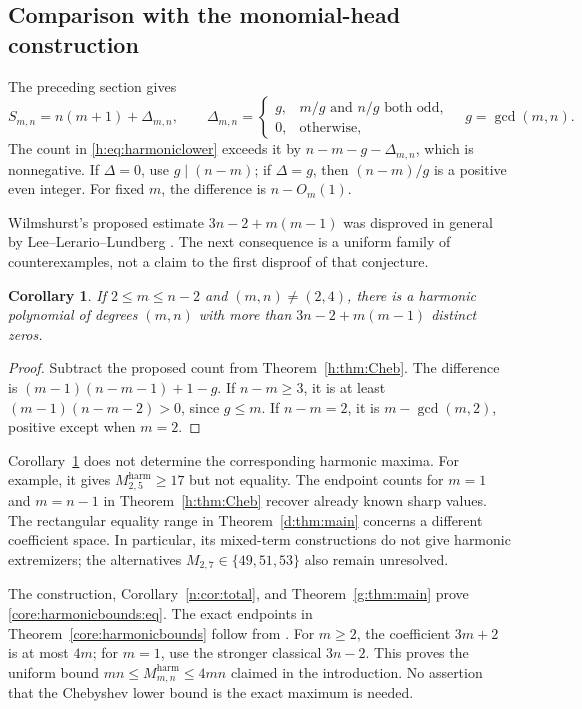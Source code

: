 \documentclass[UTF8,11pt]{ctexart}
\newtheorem{cor}[thm]{Corollary}
\theoremstyle{definition}
\numberwithin{equation}{section}
\begin{document}
\subsection{Comparison with the monomial-head construction}
The preceding section gives
\[
 S_{m,n}=n(m+1)+\Delta_{m,n},\qquad
 \Delta_{m,n}=\begin{cases}
 g,&m/g\text{ and }n/g\text{ both odd},\\
 0,&\text{otherwise},
 \end{cases}\quad g=\gcd(m,n).
\]
The count in \eqref{h:eq:harmoniclower} exceeds it by $n-m-g-\Delta_{m,n}$,
which is nonnegative. If $\Delta=0$, use $g\mid(n-m)$; if $\Delta=g$,
then $(n-m)/g$ is a positive even integer. For fixed $m$, the difference
is $n-O_m(1)$.

Wilmshurst's proposed estimate $3n-2+m(m-1)$ was disproved in general by
Lee--Lerario--Lundberg \cite[author version v1, pp.~2--3]{LLL15}.
The next consequence is a uniform family of counterexamples, not a
claim to the first disproof of that conjecture.
\begin{cor}\label{h:cor:Wilmshurst}
If $2\le m\le n-2$ and $(m,n)\ne(2,4)$, there is a harmonic polynomial
of degrees $(m,n)$ with more than $3n-2+m(m-1)$ distinct zeros.
\end{cor}
\begin{proof}
Subtract the proposed count from Theorem~\ref{h:thm:Cheb}. The difference is
$(m-1)(n-m-1)+1-g$. If $n-m\ge3$, it is at least
$(m-1)(n-m-2)>0$, since $g\le m$. If $n-m=2$, it is
$m-\gcd(m,2)$, positive except when $m=2$.
\end{proof}

Corollary~\ref{h:cor:Wilmshurst} does not determine the corresponding
harmonic maxima. For example, it gives $M^{\mathrm{harm}}_{2,5}\ge17$
but not equality. The endpoint counts for $m=1$ and $m=n-1$ in
Theorem~\ref{h:thm:Cheb} recover already known sharp values.
The rectangular equality range in Theorem~\ref{d:thm:main} concerns a
different coefficient space. In particular, its mixed-term constructions
do not give harmonic extremizers; the alternatives
$M_{2,7}\in\{49,51,53\}$ also remain unresolved.


The construction, Corollary~\ref{n:cor:total}, and
Theorem~\ref{g:thm:main} prove \eqref{core:harmonicbounds:eq}.
The exact endpoints in Theorem~\ref{core:harmonicbounds} follow from
\cite{KS03,Gey08,Wil98}. For $m\ge2$, the coefficient $3m+2$ is at most
$4m$; for $m=1$, use the stronger classical $3n-2$. This proves the
uniform bound $mn\le M^{\mathrm{harm}}_{m,n}\le4mn$ claimed in the introduction.
No assertion that the Chebyshev lower bound is the exact maximum is needed.
\end{document}
